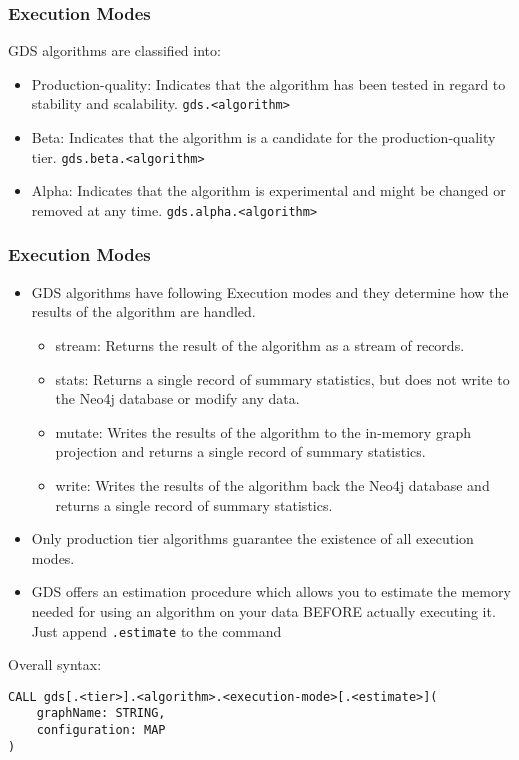 \begin{frame}[fragile]\frametitle{Execution Modes}

GDS algorithms are classified into:


\begin{itemize}
\item Production-quality: Indicates that the algorithm has been tested in regard to stability and scalability. \lstinline|gds.<algorithm>|
\item Beta: Indicates that the algorithm is a candidate for the production-quality tier. \lstinline|gds.beta.<algorithm>|
\item Alpha: Indicates that the algorithm is experimental and might be changed or removed at any time. \lstinline|gds.alpha.<algorithm>|
\end{itemize}

\end{frame}

\begin{frame}[fragile]\frametitle{Execution Modes}

\begin{itemize}
\item GDS algorithms have following Execution modes and they determine how the results of the algorithm are handled.
	\begin{itemize}
	\item stream: Returns the result of the algorithm as a stream of records.
	\item stats: Returns a single record of summary statistics, but does not write to the Neo4j database or modify any data.
	\item mutate: Writes the results of the algorithm to the in-memory graph projection and returns a single record of summary statistics.
	\item write: Writes the results of the algorithm back the Neo4j database and returns a single record of summary statistics.
	\end{itemize}
\item Only production tier algorithms guarantee the existence of all execution modes.
\item GDS offers an estimation procedure which allows you to estimate the memory needed for using an algorithm on your data BEFORE actually executing it. Just append \lstinline|.estimate| to the command
\end{itemize}


Overall syntax:

\begin{lstlisting}
CALL gds[.<tier>].<algorithm>.<execution-mode>[.<estimate>](
	graphName: STRING,
	configuration: MAP
)
\end{lstlisting}

\end{frame}



